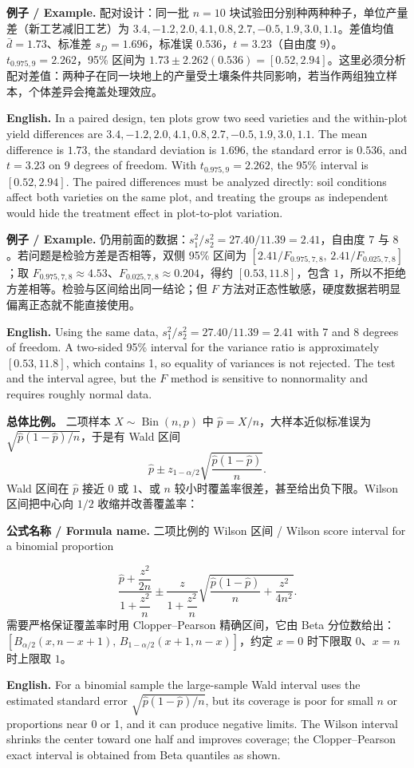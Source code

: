 \documentclass[UTF8,11pt,a4paper]{ctexart}
\newcommand{\EN}[1]{\par\noindent\textbf{English.} #1\par}
\newcommand{\FORMULA}[2]{\par\noindent\textbf{公式名称 / Formula name.} #1 / #2\par}
\newcommand{\EX}[2]{\par\noindent\textbf{例子 / Example.} #1\par\EN{#2}}
\begin{document}
\EX{配对设计：同一批 $n=10$ 块试验田分别种两种种子，单位产量差（新工艺减旧工艺）为 $3.4,-1.2,2.0,4.1,0.8,2.7,-0.5,1.9,3.0,1.1$。差值均值 $\bar d=1.73$、标准差 $s_D=1.696$，标准误 $0.536$，$t=3.23$（自由度 $9$）。$t_{0.975,9}=2.262$，95\% 区间为 $1.73\pm2.262(0.536)=[0.52,2.94]$。这里必须分析配对差值：两种子在同一块地上的产量受土壤条件共同影响，若当作两组独立样本，个体差异会掩盖处理效应。}{In a paired design, ten plots grow two seed varieties and the within-plot yield differences are $3.4,-1.2,2.0,4.1,0.8,2.7,-0.5,1.9,3.0,1.1$. The mean difference is $1.73$, the standard deviation is $1.696$, the standard error is $0.536$, and $t=3.23$ on 9 degrees of freedom. With $t_{0.975,9}=2.262$, the 95\% interval is $[0.52,2.94]$. The paired differences must be analyzed directly: soil conditions affect both varieties on the same plot, and treating the groups as independent would hide the treatment effect in plot-to-plot variation.}

\EX{仍用前面的数据：$s_1^2/s_2^2=27.40/11.39=2.41$，自由度 $7$ 与 $8$。若问题是检验方差是否相等，双侧 95\% 区间为 $[2.41/F_{0.975,7,8},\,2.41/F_{0.025,7,8}]$；取 $F_{0.975,7,8}\approx4.53$、$F_{0.025,7,8}\approx0.204$，得约 $[0.53,11.8]$，包含 $1$，所以不拒绝方差相等。检验与区间给出同一结论；但 $F$ 方法对正态性敏感，硬度数据若明显偏离正态就不能直接使用。}{Using the same data, $s_1^2/s_2^2=27.40/11.39=2.41$ with 7 and 8 degrees of freedom. A two-sided 95\% interval for the variance ratio is approximately $[0.53,11.8]$, which contains 1, so equality of variances is not rejected. The test and the interval agree, but the $F$ method is sensitive to nonnormality and requires roughly normal data.}

\noindent\textbf{总体比例。} 二项样本 $X\sim\operatorname{Bin}(n,p)$ 中 $\hat p=X/n$，大样本近似标准误为 $\sqrt{\hat p(1-\hat p)/n}$，于是有 Wald 区间
\[
\hat p\pm z_{1-\alpha/2}\sqrt{\frac{\hat p(1-\hat p)}{n}}.
\]
Wald 区间在 $\hat p$ 接近 $0$ 或 $1$、或 $n$ 较小时覆盖率很差，甚至给出负下限。Wilson 区间把中心向 $1/2$ 收缩并改善覆盖率：
\FORMULA{二项比例的 Wilson 区间}{Wilson score interval for a binomial proportion}
\[
\frac{\hat p+\dfrac{z^2}{2n}}{1+\dfrac{z^2}{n}}
\pm
\frac{z}{1+\dfrac{z^2}{n}}
\sqrt{\frac{\hat p(1-\hat p)}{n}+\frac{z^2}{4n^2}}.
\]
需要严格保证覆盖率时用 Clopper--Pearson 精确区间，它由 Beta 分位数给出：$[B_{\alpha/2}(x,n-x+1),\,B_{1-\alpha/2}(x+1,n-x)]$，约定 $x=0$ 时下限取 $0$、$x=n$ 时上限取 $1$。
\EN{For a binomial sample the large-sample Wald interval uses the estimated standard error $\sqrt{\hat p(1-\hat p)/n}$, but its coverage is poor for small $n$ or proportions near 0 or 1, and it can produce negative limits. The Wilson interval shrinks the center toward one half and improves coverage; the Clopper--Pearson exact interval is obtained from Beta quantiles as shown.}
\end{document}

